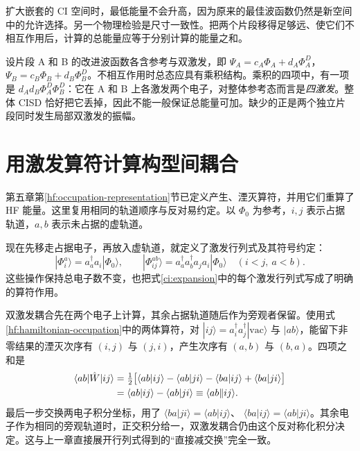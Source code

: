 扩大嵌套的 CI 空间时，最低能量不会升高，因为原来的最佳波函数仍然是新空间中的允许选择。另一个物理检验是尺寸一致性。把两个片段移得足够远、使它们不相互作用后，计算的总能量应等于分别计算的能量之和。

设片段 A 和 B 的改进波函数各含参考与双激发，即 $\Psi_A=c_A\Phi_A+d_A\Phi_A^D$，$\Psi_B=c_B\Phi_B+d_B\Phi_B^D$。不相互作用时总态应具有乘积结构。乘积的四项中，有一项是 $d_Ad_B\Phi_A^D\Phi_B^D$：它在 A 和 B 上各激发两个电子，对整体参考态而言是\emph{四激发}。整体 CISD 恰好把它丢掉，因此不能一般保证总能量可加。缺少的正是两个独立片段同时发生局部双激发的振幅。

\section{用激发算符计算构型间耦合}\label{corr:second-quantization}
第五章第\ref{hf:occupation-representation}节已定义产生、湮灭算符，并用它们重算了 HF 能量。这里复用相同的轨道顺序与反对易约定。以 $\Phi_0$ 为参考，$i,j$ 表示占据轨道，$a,b$ 表示未占据的虚轨道。

现在先移走占据电子，再放入虚轨道，就定义了激发行列式及其符号约定：
\begin{equation}\label{corr:excitation-operators}
|\Phi_i^a\rangle=a_a^\dagger a_i|\Phi_0\rangle,\qquad
|\Phi_{ij}^{ab}\rangle=a_a^\dagger a_b^\dagger a_j a_i|\Phi_0\rangle
\quad(i<j,\ a<b).
\end{equation}
这些操作保持总电子数不变，也把式\eqref{ci:expansion}中的每个激发行列式写成了明确的算符作用。

双激发耦合先在两个电子上计算，其余占据轨道随后作为旁观者保留。使用式\eqref{hf:hamiltonian-occupation}中的两体算符，对 $|ij\rangle=a_i^\dagger a_j^\dagger|\mathrm{vac}\rangle$ 与 $|ab\rangle$，能留下非零结果的湮灭次序有 $(i,j)$ 与 $(j,i)$，产生次序有 $(a,b)$ 与 $(b,a)$。四项之和是
\begin{align}
\langle ab|\hat W|ij\rangle
&=\tfrac12\bigl[\langle ab|ij\rangle-\langle ab|ji\rangle
-\langle ba|ij\rangle+\langle ba|ji\rangle\bigr]\notag\\
&=\langle ab|ij\rangle-\langle ab|ji\rangle
\equiv\langle ab\Vert ij\rangle.
\end{align}
最后一步交换两电子积分坐标，用了
$\langle ba|ji\rangle=\langle ab|ij\rangle$、
$\langle ba|ij\rangle=\langle ab|ji\rangle$。其余电子作为相同的旁观轨道时，正交积分给一，双激发耦合仍由这个反对称化积分决定。这与上一章直接展开行列式得到的“直接减交换”完全一致。


